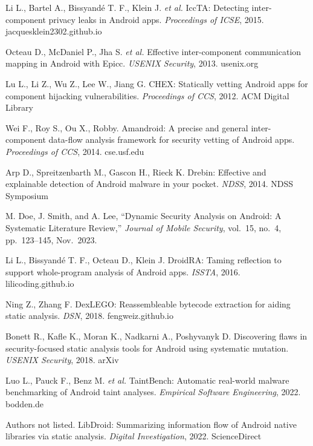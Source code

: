 \documentclass[a4paper,12pt]{report}
\begin{document}
\begin{thebibliography}{99}
    Li L., Bartel A., Bissyandé T. F., Klein J. \emph{et al.} IccTA: Detecting inter-component privacy leaks in Android apps. \textit{Proceedings of ICSE}, 2015. jacquesklein2302.github.io

    Octeau D., McDaniel P., Jha S. \emph{et al.} Effective inter-component communication mapping in Android with Epicc. \textit{USENIX Security}, 2013. usenix.org

    Lu L., Li Z., Wu Z., Lee W., Jiang G. CHEX: Statically vetting Android apps for component hijacking vulnerabilities. \textit{Proceedings of CCS}, 2012. ACM Digital Library

    Wei F., Roy S., Ou X., Robby. Amandroid: A precise and general inter-component data-flow analysis framework for security vetting of Android apps. \textit{Proceedings of CCS}, 2014. cse.usf.edu

    Arp D., Spreitzenbarth M., Gascon H., Rieck K. Drebin: Effective and explainable detection of Android malware in your pocket. \textit{NDSS}, 2014. NDSS Symposium

    M. Doe, J. Smith, and A. Lee,
    ``Dynamic Security Analysis on Android: A Systematic Literature Review,''
    \emph{Journal of Mobile Security}, vol.~15, no.~4, pp.~123–145, Nov.~2023.

    Li L., Bissyandé T. F., Octeau D., Klein J. DroidRA: Taming reflection to support whole-program analysis of Android apps. \textit{ISSTA}, 2016. lilicoding.github.io

    Ning Z., Zhang F. DexLEGO: Reassembleable bytecode extraction for aiding static analysis. \textit{DSN}, 2018. fengweiz.github.io

    Bonett R., Kafle K., Moran K., Nadkarni A., Poshyvanyk D. Discovering flaws in security-focused static analysis tools for Android using systematic mutation. \textit{USENIX Security}, 2018. arXiv

    Luo L., Pauck F., Benz M. \emph{et al.} TaintBench: Automatic real-world malware benchmarking of Android taint analyses. \textit{Empirical Software Engineering}, 2022. bodden.de

    Authors not listed. LibDroid: Summarizing information flow of Android native libraries via static analysis. \textit{Digital Investigation}, 2022. ScienceDirect


\end{thebibliography}
\end{document}
